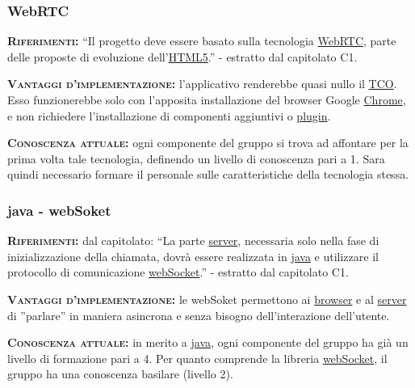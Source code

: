 \subsubsection{WebRTC}
\begin{description}
	\item{\scshape\bfseries Riferimenti:} ``Il progetto deve essere basato sulla tecnologia \underline{WebRTC}, parte delle proposte di evoluzione dell'\underline{HTML5}.'' - estratto dal capitolato C1.

	\item{\scshape\bfseries Vantaggi d'implementazione:} l'applicativo renderebbe quasi nullo il \underline{TCO}. Esso funzionerebbe solo con l'apposita installazione del browser Google \underline{Chrome}, e non richiedere l'installazione di componenti aggiuntivi o \underline{plugin}.
	
	\item{\scshape\bfseries Conoscenza attuale:} ogni componente del gruppo si trova ad affontare per la prima volta tale tecnologia, definendo un livello di conoscenza pari a 1. Sara quindi necessario formare il personale sulle caratteristiche della tecnologia stessa.
\end{description}

\subsubsection{java - webSoket}
\begin{description}
	\item{\scshape\bfseries Riferimenti:} dal capitolato: ``La parte \underline{server}, necessaria solo nella fase di inizializzazione della chiamata, dovrà essere realizzata in \underline{java} e utilizzare il protocollo di comunicazione \underline{webSocket}.'' - estratto dal capitolato C1.
	
	\item{\scshape\bfseries Vantaggi d'implementazione:} le webSoket permettono ai \underline{browser} e al \underline{server} di ''parlare'' in maniera asincrona e senza bisogno dell'interazione dell'utente.

	\item{\scshape\bfseries Conoscenza attuale:} in merito a \underline{java}, ogni componente del gruppo ha già un livello di formazione pari a 4. Per quanto comprende la libreria  \underline{webSocket}, il gruppo ha una conoscenza basilare (livello 2).  
\end{description}
